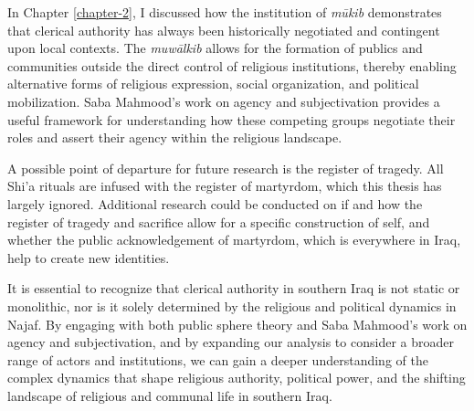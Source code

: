 In Chapter \ref{chapter-2}, I discussed how the institution of \emph{mūkib} demonstrates that clerical authority has always been historically negotiated and contingent upon local contexts. The \emph{muwālkib} allows for the formation of publics and communities outside the direct control of religious institutions, thereby enabling alternative forms of religious expression, social organization, and political mobilization. Saba Mahmood's work on agency and subjectivation provides a useful framework for understanding how these competing groups negotiate their roles and assert their agency within the religious landscape.

A possible point of departure for future research is the register of tragedy. All Shi'a rituals are infused with the register of martyrdom, which this thesis has largely ignored. Additional research could be conducted on if and how the register of tragedy and sacrifice allow for a specific construction of self, and whether the public acknowledgement of martyrdom, which is everywhere in Iraq, help to create new identities. 

It is essential to recognize that clerical authority in southern Iraq is not static or monolithic, nor is it solely determined by the religious and political dynamics in Najaf. By engaging with both public sphere theory and Saba Mahmood's work on agency and subjectivation, and by expanding our analysis to consider a broader range of actors and institutions, we can gain a deeper understanding of the complex dynamics that shape religious authority, political power, and the shifting landscape of religious and communal life in southern Iraq.